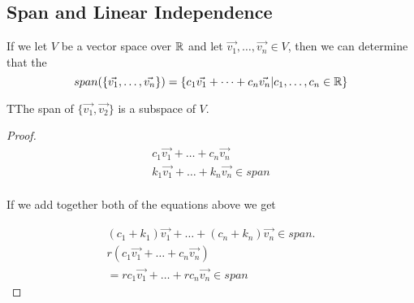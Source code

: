 \subsection{Span and Linear Independence}

  If we let $V$ be a vector space over $\mathbb{R}$ and let $\vec{v_1},\dots,\vec{v_n}\in V$, then we can determine that the 
  \begin{equation}
    span(\{\vec{v_1},\dots,\vec{v_n}\})=\{c_1\vec{v_1}+\dots+c_n\vec{v_n}|c_1,\dots,c_n\in\mathbb{R}\}
  \end{equation}

  \begin{prop}
    TThe span of $\{\vec{v_1},\vec{v_2}\}$ is a subspace of $V$.
    \begin{proof}
      \begin{align}
        c_1\vec{v_1}+\dots+c_n\vec{v_n}\\
        k_1\vec{v_1}+\dots+k_n\vec{v_n}\in span\\
      \end{align}

      If we add together both of the equations above we get

      \begin{align}
        (c_1+k_1)\vec{v_1}+\dots+(c_n+k_n)\vec{v_n}\in span.\\
        r(c_1\vec{v_1}+\dots+c_n\vec{v_n})\\
        =rc_1\vec{v_1}+\dots+rc_n\vec{v_n}\in span
      \end{align}
    \end{proof}
  \end{prop}

